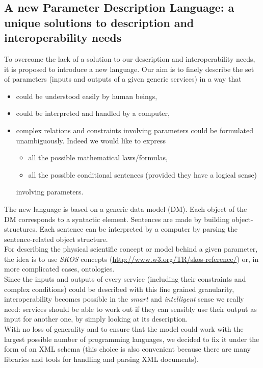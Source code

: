 \documentclass[a4paper,11pt] {ivoa}
\begin{document}
\subsection{A new Parameter Description Language: a unique solutions to description and interoperability needs}
To overcome the lack of a  solution to our description and interoperability
needs, it is proposed to introduce a new language.
Our aim is to finely describe the set of parameters (inputs and outputs of a given generic services)
in a way that
\begin{itemize}
\item could be understood easily by human beings,
\item could be interpreted and handled by a computer,
\item complex relations and constraints involving parameters could be formulated unambiguously.
Indeed we would like to express
\begin{itemize}
\item all the possible mathematical laws/formulas,
\item all the possible conditional sentences (provided they have a logical sense)
\end{itemize}
involving parameters.
\end{itemize}
The new language is based on a generic data model (DM). Each object of the DM corresponds to a
syntactic element. Sentences are made by building object-structures.
Each sentence can be interpreted by a computer by parsing the sentence-related object structure.\\
For describing the physical scientific concept or model behind a given parameter, the idea is to use
{\it SKOS} concepts
(\href{http://www.w3.org/TR/skos-reference/}{http://www.w3.org/TR/skos-reference/}) or, in more
complicated cases, ontologies.\\

Since the inputs and outputs  of every service (including their constraints and complex conditions)
could be described with this fine grained granularity, interoperability becomes possible in the {\it
smart} and {\it intelligent} sense we really need: services should be able to work out if they can
sensibly use their output as input for another one, by simply looking at its description.\\

With no loss of generality and to ensure that the model could work with the largest possible number
of programming languages, we decided to fix it under the form of an XML schema (this choice is also
convenient because there are many libraries and tools for handling and parsing XML documents).\\
\end{document}
